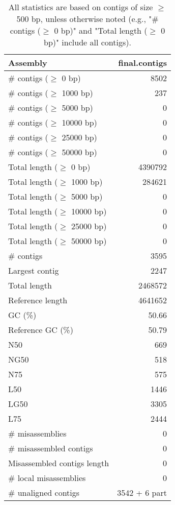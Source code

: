 \documentclass[12pt,a4paper]{article}
\begin{document}
\begin{table}[ht]
\begin{center}
\caption{All statistics are based on contigs of size $\geq$ 500 bp, unless otherwise noted (e.g., "\# contigs ($\geq$ 0 bp)" and "Total length ($\geq$ 0 bp)" include all contigs).}
\begin{tabular}{|l*{1}{|r}|}
\hline
Assembly & final.contigs \\ \hline
\# contigs ($\geq$ 0 bp) & 8502 \\ \hline
\# contigs ($\geq$ 1000 bp) & 237 \\ \hline
\# contigs ($\geq$ 5000 bp) & 0 \\ \hline
\# contigs ($\geq$ 10000 bp) & 0 \\ \hline
\# contigs ($\geq$ 25000 bp) & 0 \\ \hline
\# contigs ($\geq$ 50000 bp) & 0 \\ \hline
Total length ($\geq$ 0 bp) & 4390792 \\ \hline
Total length ($\geq$ 1000 bp) & 284621 \\ \hline
Total length ($\geq$ 5000 bp) & 0 \\ \hline
Total length ($\geq$ 10000 bp) & 0 \\ \hline
Total length ($\geq$ 25000 bp) & 0 \\ \hline
Total length ($\geq$ 50000 bp) & 0 \\ \hline
\# contigs & 3595 \\ \hline
Largest contig & 2247 \\ \hline
Total length & 2468572 \\ \hline
Reference length & 4641652 \\ \hline
GC (\%) & 50.66 \\ \hline
Reference GC (\%) & 50.79 \\ \hline
N50 & 669 \\ \hline
NG50 & 518 \\ \hline
N75 & 575 \\ \hline
L50 & 1446 \\ \hline
LG50 & 3305 \\ \hline
L75 & 2444 \\ \hline
\# misassemblies & 0 \\ \hline
\# misassembled contigs & 0 \\ \hline
Misassembled contigs length & 0 \\ \hline
\# local misassemblies & 0 \\ \hline
\# unaligned contigs & 3542 + 6 part \\ \hline

\end{tabular}
\end{center}
\end{table}
\end{document}
